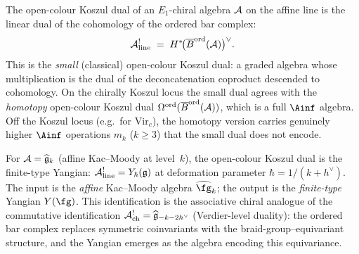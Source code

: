 \begin{construction}
\label{constr:dg-shifted-yangian-from-bar}
The open-colour Koszul dual of an $E_1$-chiral algebra $\mathcal{A}$ on the
affine line is the linear dual of the cohomology of the
ordered bar complex:
\[
\mathcal{A}^!_{\mathrm{line}}
\;=\;
H^*\!\bigl(\overline{B}^{\mathrm{ord}}(\mathcal{A})\bigr)^\vee.
\]
This is the \emph{small} (classical) open-colour Koszul dual: a
graded algebra whose multiplication is the dual of the
deconcatenation coproduct descended to cohomology. On the
chirally Koszul locus the small dual agrees with the
\emph{homotopy} open-colour Koszul dual
$\Omega^{\mathrm{ord}}(\overline{B}^{\mathrm{ord}}(\mathcal{A}))$,
which is a full $\Ainf$ algebra. Off the Koszul locus
(e.g.\ for $\mathrm{Vir}_c$), the homotopy version carries
genuinely higher $\Ainf$ operations $m_k$ ($k \ge 3$) that
the small dual does not encode.

For $\mathcal{A}=\widehat{\mathfrak g}_k$ (affine Kac--Moody at
level~$k$), the open-colour Koszul dual is the finite-type Yangian:
$\mathcal{A}^!_{\mathrm{line}}=Y_\hbar(\mathfrak g)$ at deformation parameter
$\hbar=1/(k+h^\vee)$. The input is the \emph{affine} Kac--Moody
algebra $\widehat{\fg}_k$; the output is the \emph{finite-type}
Yangian $Y(\fg)$. This identification is the
associative chiral analogue of the commutative identification
$\mathcal{A}^!_{\mathrm{ch}}=\widehat{\mathfrak g}_{-k-2h^\vee}$
(Verdier-level duality): the ordered bar complex replaces
symmetric coinvariants with the braid-group--equivariant
structure, and the Yangian emerges as the algebra encoding
this equivariance.


\end{construction}
